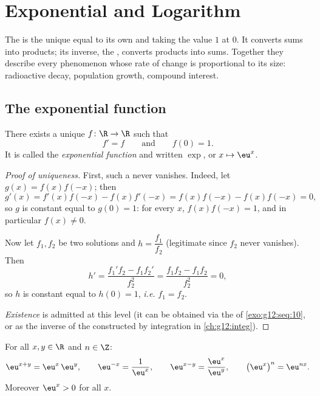 \chapter{Exponential and Logarithm}\label{ch:g12:exp}

The  is the unique  equal to its own 
and taking the value $1$ at $0$. It converts sums into products; its inverse,
the , converts products into sums. Together they describe
every phenomenon whose rate of change is proportional to its size:
radioactive decay, population growth, compound interest.

\section{The exponential function}

\begin{theorem}\label{thm:g12:exp:existence}
There exists a unique   $f \colon \R \to \R$ such that
\[
f' = f \qquad\text{and}\qquad f(0) = 1 .
\]
It is called the \emph{exponential function} and written
$\exp$, or $x \mapsto \eu^x$.
\end{theorem}

\begin{proof}[Proof of uniqueness]
First, such a  never vanishes. Indeed, let
$g(x) = f(x)f(-x)$; then
\[
g'(x) = f'(x)f(-x) - f(x)f'(-x) = f(x)f(-x) - f(x)f(-x) = 0,
\]
so $g$ is constant equal to $g(0) = 1$: for every $x$,
$f(x)f(-x) = 1$, and in particular $f(x) \neq 0$.

Now let $f_1, f_2$ be two solutions and $h = \dfrac{f_1}{f_2}$ (legitimate
since $f_2$ never vanishes). Then
\[
h' = \frac{f_1' f_2 - f_1 f_2'}{f_2^2} = \frac{f_1 f_2 - f_1 f_2}{f_2^2} = 0,
\]
so $h$ is constant equal to $h(0) = 1$, \emph{i.e.} $f_1 = f_2$.

\emph{Existence} is admitted at this level (it can be obtained via the
 of \cref{exo:g12:seq:10}, or as the inverse of the 
constructed by integration in \cref{ch:g12:integ}).
\end{proof}

\begin{proposition}\label{prop:g12:exp:funceq}
For all $x, y \in \R$ and $n \in \Z$:
\[
\eu^{x+y} = \eu^x\,\eu^y, \qquad
\eu^{-x} = \frac{1}{\eu^x}, \qquad
\eu^{x-y} = \frac{\eu^x}{\eu^y}, \qquad
\bigl(\eu^{x}\bigr)^n = \eu^{nx}.
\]
Moreover $\eu^x > 0$ for all $x$.
\end{proposition}

